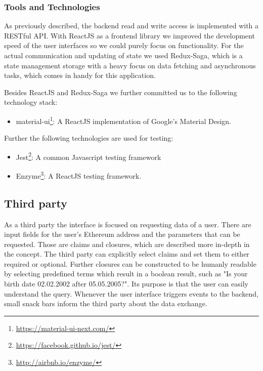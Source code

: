 \subsubsection{Tools and Technologies}

As previously described, the backend read and write access is implemented with a RESTful API.
With ReactJS as a frontend library we improved the development speed of the user interfaces so we could purely focus
on functionality.
For the actual communication and updating of state we used Redux-Saga, which is a state management storage with a heavy focus
on data fetching and asynchronous tasks, which comes in handy for this application.

Besides ReactJS and Redux-Saga we further committed us to the following technology stack:

\begin{itemize}
\item material-ui\footnote{\url{https://material-ui-next.com/}}: A ReactJS implementation of Google's Material Design.
\end{itemize}

Further the following technologies are used for testing:

\begin{itemize}
\item Jest\footnote{\url{https://facebook.github.io/jest/}}: A common Javascript testing framework
\item Enzyme\footnote{\url{http://airbnb.io/enzyme/}}: A ReactJS testing framework.
\end{itemize}

\subsection{Third party}

As a third party the interface is focused on requesting data of a user. There are input fields for the user's Ethereum address
and the parameters that can be requested. Those are claims and closures, which are described more in-depth in the concept.
The third party can explicitly select claims and set them to either required or optional.
Further closures can be constructed to be humanly readable by selecting predefined terms which result in a boolean result,
such as "Is your birth date 02.02.2002 after 05.05.2005?". Its purpose is that the user can easily understand the query.
Whenever the user interface triggers events to the backend, small snack bars inform the third party about the data exchange.

